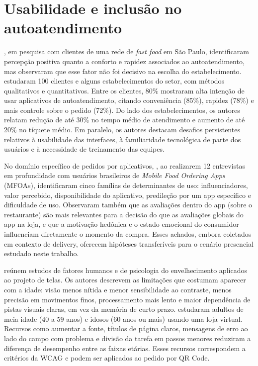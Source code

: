 \section{Usabilidade e inclusão no autoatendimento}

, em pesquisa com clientes de uma rede de \emph{fast food} em São Paulo, identificaram percepção positiva quanto a conforto e rapidez associados ao autoatendimento, mas observaram que esse fator não foi decisivo na escolha do estabelecimento.  estudaram 100 clientes e alguns estabelecimentos do setor, com métodos qualitativos e quantitativos. Entre os clientes, 80\% mostraram alta intenção de usar aplicativos de autoatendimento, citando conveniência (85\%), rapidez (78\%) e mais controle sobre o pedido (72\%). Do lado dos estabelecimentos, os autores relatam redução de até 30\% no tempo médio de atendimento e aumento de até 20\% no tíquete médio. Em paralelo, os autores destacam desafios persistentes relativos à usabilidade das interfaces, à familiaridade tecnológica de parte dos usuários e à necessidade de treinamento das equipes.

No domínio específico de pedidos por aplicativos, , ao realizarem 12 entrevistas em profundidade com usuários brasileiros de \emph{Mobile Food Ordering Apps} (MFOAs), identificaram cinco famílias de determinantes de uso: influenciadores, valor percebido, disponibilidade do aplicativo, predileção por um app específico e dificuldade de uso. Observaram também que as avaliações dentro do app (sobre o restaurante) são mais relevantes para a decisão do que as avaliações globais do app na loja, e que a motivação hedônica e o estado emocional do consumidor influenciam diretamente o momento da compra. Esses achados, embora coletados em contexto de delivery, oferecem hipóteses transferíveis para o cenário presencial estudado neste trabalho.

 reúnem estudos de fatores humanos e de psicologia do envelhecimento aplicados ao projeto de telas. Os autores descrevem as limitações que costumam aparecer com a idade: visão menos nítida e menor sensibilidade ao contraste, menos precisão em movimentos finos, processamento mais lento e maior dependência de pistas visuais claras, em vez da memória de curto prazo.  estudaram adultos de meia-idade (40 a 59 anos) e idosos (60 anos ou mais) usando uma loja virtual. Recursos como aumentar a fonte, títulos de página claros, mensagens de erro ao lado do campo com problema e divisão da tarefa em passos menores reduziram a diferença de desempenho entre as faixas etárias. Esses recursos correspondem a critérios da WCAG e podem ser aplicados ao pedido por QR Code.

